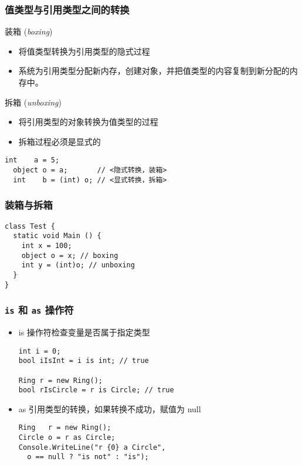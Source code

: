 \begin{frame}[fragile]
\frametitle{值类型与引用类型之间的转换}
\begin{block}{装箱 (\textit{boxing})}
  \begin{itemize}
  \item 将值类型转换为引用类型的隐式过程
  \item 系统为引用类型分配新内存，创建对象，并把值类型的内容复制到新分配的内存中。
  \end{itemize}
\end{block}
\pause
\begin{block}{拆箱 (\textit{unboxing})}
  \begin{itemize}
  \item 将引用类型的对象转换为值类型的过程
  \item 拆箱过程必须是显式的
  \end{itemize}
\end{block}
\pause
\begin{lstlisting}[escapeinside=<>]
  int    a = 5;
  object o = a;       // <隐式转换，装箱>
  int    b = (int) o; // <显式转换，拆箱>

\end{lstlisting}
\end{frame}

\begin{frame}[fragile]
\frametitle{装箱与拆箱}

\begin{lstlisting}
class Test {
  static void Main () {
    int x = 100;
    object o = x; // boxing
    int y = (int)o; // unboxing
  }
}

\end{lstlisting}
  \begin{figure}[htbp]
    \centering
    
  \end{figure}

\end{frame}

\begin{frame}[fragile]
\frametitle{\texttt{is} 和 \texttt{as} 操作符}
\begin{itemize}
\item is 操作符检查变量是否属于指定类型
\begin{lstlisting}
int i = 0;
bool iIsInt = i is int; // true

Ring r = new Ring();
bool rIsCircle = r is Circle; // true
\end{lstlisting}
\pause
\item as 引用类型的转换，如果转换不成功，赋值为 null
\begin{lstlisting}
Ring   r = new Ring();
Circle o = r as Circle;
Console.WriteLine("r {0} a Circle",
  o == null ? "is not" : "is");
\end{lstlisting}
\end{itemize}
\end{frame}

